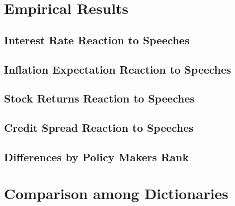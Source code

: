 \section{Empirical Results}



\subsection{Interest Rate Reaction to Speeches}

\subsection{Inflation Expectation Reaction to Speeches}

\subsection{Stock Returns Reaction to Speeches}

\begin{landscape}
    
    \end{landscape} 
\begin{landscape}
    
    \end{landscape} 
\begin{landscape}
    
    \end{landscape}
         
\subsection{Credit Spread Reaction to Speeches}


\begin{landscape}
    
    \end{landscape}
\subsection{Differences by Policy Makers Rank}


\section{Comparison among Dictionaries}

